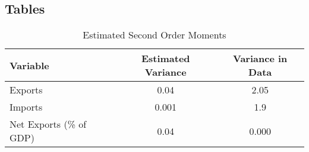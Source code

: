 \documentclass{article}
\begin{document}
\resizebox{0.75\textwidth}{!}{\usebox\myv}



\subsection*{Tables}

\begin{table}[htbp]\centering \caption{Estimated Second Order Moments \label{Estimated Second Order Moments}}
\begin{tabular}{l c c}\hline\hline
Variable & Estimated Variance & Variance in Data\\ \hline
Exports & 0.04 & 2.05 \\
Imports & 0.001 & 1.9 \\
Net Exports (\% of GDP) & 0.04 & 0.000 \\ \hline
\end{tabular}
\end{table}
\end{document}
